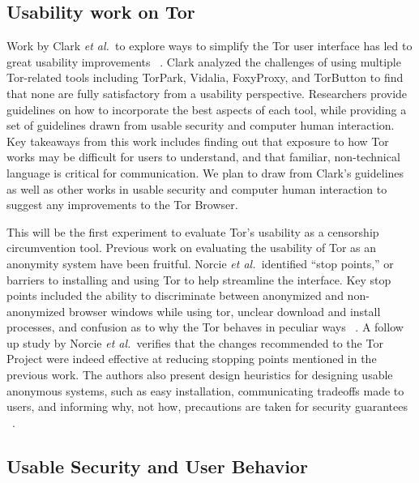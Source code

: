 \documentclass[letterpaper,twocolumn,11pt]{article}
\def\etal{{\it et al.~}}
\begin{document}
\subsection{Usability work on Tor}
\indent \indent  Work by Clark \etal to explore ways to simplify the Tor user interface
has led to great usability improvements ~\cite{clark2007usability}.  Clark analyzed the challenges 
of using multiple Tor-related tools including TorPark, Vidalia, FoxyProxy, and TorButton to find that
none are fully satisfactory from a usability perspective. Researchers provide guidelines on 
how to incorporate the best aspects of each tool, while providing a set of guidelines drawn from
usable security and computer human interaction. Key takeaways from this work includes 
finding out that exposure to how Tor works may be difficult for users to understand, and that 
familiar, non-technical language is critical for communication. We plan to draw from Clark's
guidelines as well as other works in usable security and computer human interaction to suggest
any improvements to the Tor Browser. 

This will be the first experiment to evaluate Tor's usability as a censorship circumvention tool.
Previous work on evaluating the usability of Tor as an anonymity system have been fruitful. 
Norcie \etal identified ``stop points,'' or barriers to installing and using Tor to help streamline
the interface. Key stop points included the ability to discriminate between anonymized and non-
anonymized browser windows while using tor, unclear download and install processes, and 
confusion as to why the Tor behaves in peculiar ways ~\cite{norcie2012eliminating}. A follow up
study by Norcie \etal verifies that the changes recommended to the Tor Project were indeed 
effective at reducing stopping points mentioned in the previous work. The authors also present
design heuristics for designing usable anonymous systems, such as easy installation, communicating
tradeoffs made to users, and informing why, not how, precautions are taken for security guarantees ~\cite{norcie2014johnny}. 

\subsection{Usable Security and User Behavior} %
\indent {}
\end{document}
